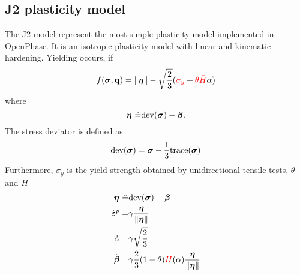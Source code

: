 \subsection*{J2 plasticity model}
The J2 model represent the most simple plasticity model implemented in OpenPhase. It is an isotropic plasticity model with linear and kinematic hardening. 
Yielding occurs, if 
\begin{equation*}
f(\mbox{\boldmath $\sigma$}, \mathbf{q}) = \|\mbox{\boldmath $\eta$}\|-\sqrt{\frac{2}{3}}(\textcolor{red}{\sigma_y} + \textcolor{red}{\theta} \textcolor{red}{\bar{H}}\alpha)
\end{equation*}
where 
\begin{equation*}
\mbox{\boldmath $\eta$}~\hat{=} \mathrm{dev}(\mbox{\boldmath $\sigma$}) - \mbox{\boldmath $\beta$}.
\end{equation*}
The stress deviator is defined as
\begin{equation*}
\mathrm{dev}(\mbox{\boldmath $\sigma$}) = \mbox{\boldmath $\sigma$} - \frac{1}{3}\mathrm{trace}(\mbox{\boldmath $\sigma$})
\end{equation*}
Furthermore, $\sigma_y$ is the yield strength obtained by unidirectional tensile tests, $\theta$ and $\bar{H}$ 
  \begin{eqnarray*}
     \mbox{\boldmath $\eta$}~\hat{=}& \mathrm{dev}(\mbox{\boldmath $\sigma$}) - \mbox{\boldmath $\beta$}\\
	\dot{\mbox{\boldmath $\varepsilon$}}^{p} =& \gamma \frac{\mbox{\boldmath $\eta$}}{\|\mbox{\boldmath $\eta$}\|}\\
	\dot{\alpha} = &\gamma\sqrt{\frac{2}{3}}\\
	\dot{\mbox{\boldmath $\beta$}} = &\gamma \frac{2}{3} (1-\theta)\textcolor{red}{\bar{H}}(\alpha)\frac{\mbox{\boldmath $\eta$}}{\|\mbox{\boldmath $\eta$}\|}
  \end{eqnarray*}
